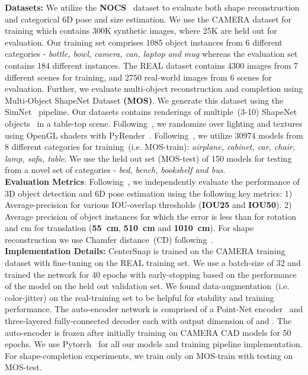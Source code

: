 \documentclass[letter, 10pt, conference]{ieeeconf}
\begin{document}
\textbf{Datasets:} We utilize the \textbf{NOCS}~\cite{wang2019normalized} dataset to evaluate both shape reconstruction and categorical 6D pose and size estimation. We use the CAMERA dataset for training which contains 300K synthetic images, where 25K are held out for evaluation. Our training set comprises 1085 object instances from 6 different categories - \textit{bottle, bowl, camera, can, laptop and mug} whereas the evaluation set contains 184 different instances. The REAL dataset contains
4300 images from 7 different scenes for training, and 2750 real-world images from 6 scenes for evaluation. Further, we evaluate multi-object reconstruction and completion using Multi-Object ShapeNet Dataset \textbf{(MOS)}. We generate this dataset using the SimNet~\cite{laskey2021simnet} pipeline. Our datasets contains  renderings of multiple~(3-10) ShapeNet objects~\cite{chang2015ShapeNet} in a table-top scene. Following~\cite{laskey2021simnet}, we randomize over lighting and textures using OpenGL shaders with PyRender~\cite{pyrender}.
Following~\cite{yuan2018pcn}, we utilize 30974 models from 8 different categories for training~(i.e. MOS-train): \textit{airplane, cabinet, car, chair, lamp, sofa, table}. We use the held out set (MOS-test) of 150 models for testing from a novel set of categories - \textit{bed, bench, bookshelf and bus}. \\
\textbf{Evaluation Metrics}: Following~\cite{wang2019normalized}, we independently evaluate the performance of 3D object detection and 6D pose estimation using the following key metrics: 1) Average-precision for various IOU-overlap thresholds (\textbf{IOU25} and \textbf{IOU50}). 2) Average precision of object instances for which the error is less than  for rotation and  cm for translation (\textbf{5\textdegree \SI{5}{\cm}}, \textbf{\textbf{5\textdegree \SI{10}{\cm}}} and \textbf{\textbf{10\textdegree \SI{10}{\cm}}}). For shape reconstruction we use Chamfer distance~(CD) following~\cite{yuan2018pcn}.\\
\textbf{Implementation Details:} CenterSnap is trained on the CAMERA training dataset with fine-tuning on the REAL training set. We use a batch-size of 32 and trained the network for 40 epochs with early-stopping based on the performance of the model on the held out validation set. We found data-augmentation~(i.e. color-jitter) on the real-training set to be helpful for stability and training performance. The auto-encoder network is comprised of a Point-Net encoder~\cite{qi2017pointnet} and three-layered fully-connected decoder each with output dimension of  and . The auto-encoder is frozen after initially training on CAMERA CAD models for 50 epochs. We use Pytorch~\cite{NEURIPS2019_9015} for all our models and training pipeline implementation. For shape-completion experiments, we train only on MOS-train with testing on MOS-test.\\
\end{document}
